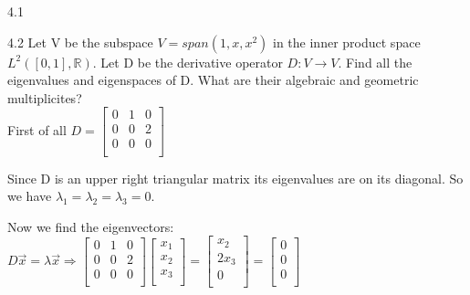 \documentclass[12pt]{article}
\newenvironment{problems}{\begin{list}{}{\setlength{\labelwidth}{.7in}}}{\end{list}}
\begin{document}

\bigskip

\begin{problems}

\item[4.1]

\item[4.2]
Let V be the subspace $V = span(1,x,x^2)$ in the inner product space $L^2([0,1],\mathbb{R})$. Let D be the derivative operator $D: V \rightarrow V$. Find all the eigenvalues and eigenspaces of D. What are their algebraic and geometric multiplicites?\\

First of all $D = 
\begin{bmatrix}
    0 & 1 & 0\\
   0 & 0 & 2\\
   0 & 0 & 0\\
  \end{bmatrix}
$

Since D is an upper right triangular matrix its eigenvalues are on its diagonal. So we have $\lambda_1 = \lambda_2 = \lambda_3 = 0$.

Now we find the eigenvectors: $D\vec x = \lambda \vec x \Rightarrow 
\begin{bmatrix}
    0 & 1 & 0\\
   0 & 0 & 2\\
   0 & 0 & 0\\
  \end{bmatrix} 
  \begin{bmatrix}
    x_1\\
   x_2\\
   x_3\\
  \end{bmatrix} = 
  \begin{bmatrix}
   x_2\\
   2x_3\\
   0 \\
  \end{bmatrix} =
  \begin{bmatrix}
    0 \\
    0 \\
    0 \\
  \end{bmatrix} $
  

\end{problems}
\end{document}
